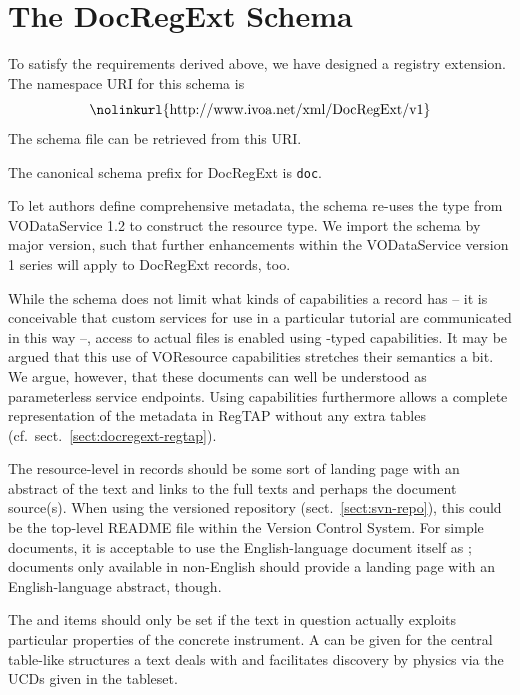 \documentclass{ivoa}
\begin{document}
\section{The DocRegExt Schema}

\label{sect:regext}

To satisfy the requirements derived above, we have designed a registry
extension.  The namespace URI for this schema is
$$\hbox{\nolinkurl{http://www.ivoa.net/xml/DocRegExt/v1}}$$
The schema file can be retrieved from this URI.

The canonical schema prefix for DocRegExt is \texttt{doc}.

To let authors define comprehensive metadata, the schema
re-uses the  type
from VODataService 1.2 \citep{2021ivoa.spec.1102D} to construct
the  resource type.  We import the schema by major
version, such that further enhancements within the VODataService version
1 series will apply to DocRegExt records, too.

While the schema does not limit what kinds of capabilities a
 record has -- it is conceivable that custom
services for use in a particular tutorial
are communicated in this way --, access to actual files is
enabled using -typed capabilities.  It may be
argued that this use of VOResource capabilities stretches their
semantics a bit.  We argue, however, that these documents can well be
understood as parameterless service endpoints.  Using capabilities
furthermore allows a complete representation of the metadata in RegTAP
without any extra tables (cf.~sect.~\ref{sect:docregext-regtap}).

The resource-level  in  records should
be some sort of landing page with an abstract of the text and links to
the full texts and perhaps the document source(s).  When using the
versioned repository (sect.~\ref{sect:svn-repo}), this could be the
top-level README file within the Version Control System.  For simple documents, it is
acceptable to use the English-language document itself as
; documents only available in non-English should
provide a landing page with an English-language abstract, though.

The  and  items should only be set
if the text in question actually exploits particular properties of the
concrete instrument.  A  can be given for the central
table-like structures a text deals with and facilitates discovery by
physics via the UCDs given in the tableset.
\end{document}
